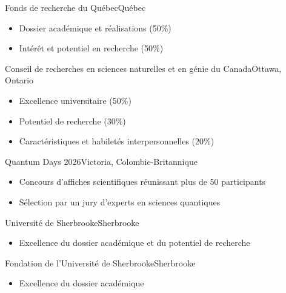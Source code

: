 

{Fonds de recherche du Québec}{Québec}
{\vspace{-12pt}
\begin{itemize}
    \item Dossier académique et réalisations (50\%)
    \item Intérêt et potentiel en recherche (50\%)
\end{itemize}}

{Conseil de recherches en sciences naturelles et en génie du Canada}{Ottawa, Ontario}
{\vspace{-12pt}
\begin{itemize}
    \item Excellence universitaire (50\%)
    \item Potentiel de recherche (30\%)
    \item Caractéristiques et habiletés interpersonnelles (20\%)
\end{itemize}}

{Quantum Days 2026}{Victoria, Colombie-Britannique}
{\vspace{-12pt}
\begin{itemize}
    \item Concours d'affiches scientifiques réunissant plus de 50 participants
    \item Sélection par un jury d'experts en sciences quantiques
\end{itemize}}

{Université de Sherbrooke}{Sherbrooke}
{\vspace{-12pt}
\begin{itemize}
    \item Excellence du dossier académique et du potentiel de recherche
\end{itemize}}

{Fondation de l'Université de Sherbrooke}{Sherbrooke}
{\vspace{-12pt}
\begin{itemize}
    \item Excellence du dossier académique
\end{itemize}}

